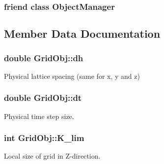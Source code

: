 \subsubsection[{\texorpdfstring{Object\+Manager}{ObjectManager}}]{\setlength{\rightskip}{0pt plus 5cm}friend class {\bf Object\+Manager}\hspace{0.3cm}{\ttfamily [friend]}}\hypertarget{class_grid_obj_a8b86bdcdb7c54a536293d8632363e114}{}\label{class_grid_obj_a8b86bdcdb7c54a536293d8632363e114}


\subsection{Member Data Documentation}
\subsubsection[{\texorpdfstring{dh}{dh}}]{\setlength{\rightskip}{0pt plus 5cm}double Grid\+Obj\+::dh}\hypertarget{class_grid_obj_a4efe4f79d600da2f459a0cc08b89b40c}{}\label{class_grid_obj_a4efe4f79d600da2f459a0cc08b89b40c}


Physical lattice spacing (same for x, y and z) 

\subsubsection[{\texorpdfstring{dt}{dt}}]{\setlength{\rightskip}{0pt plus 5cm}double Grid\+Obj\+::dt}\hypertarget{class_grid_obj_afd504b39f12eb0a237bc6313de94e094}{}\label{class_grid_obj_afd504b39f12eb0a237bc6313de94e094}


Physical time step size. 

\subsubsection[{\texorpdfstring{K\+\_\+lim}{K_lim}}]{\setlength{\rightskip}{0pt plus 5cm}int Grid\+Obj\+::\+K\+\_\+lim}\hypertarget{class_grid_obj_aaccc404f2fbdbaef8c5dd134f7d9e17f}{}\label{class_grid_obj_aaccc404f2fbdbaef8c5dd134f7d9e17f}


Local size of grid in Z-\/direction. 

